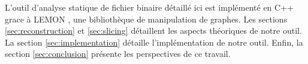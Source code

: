   \vspace{1em}


  L'outil d'analyse statique de fichier binaire détaillé ici est implémenté en
  C++ grace à LEMON \cite{DJK11}, une bibliothèque de manipulation de
  graphes. Les sections \ref{sec:reconstruction} et \ref{sec:slicing} détaillent
  les aspects théoriques de notre outil. La section \ref{sec:implementation}
  détaille l'implémentation de notre outil. Enfin, la section
  \ref{sec:conclusion} présente les perspectives de ce travail.

